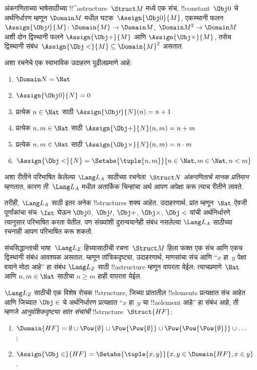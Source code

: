 \documentclass[../../../include/open-logic-section]{subfiles}
\begin{document}
\begin{ex}
अंकगणिताच्या भाषेसाठीच्या !!^a{structure}~$\Struct M$ मध्ये एक संच,
!!{constant}~$\Obj 0$ चे अर्थनिर्धारण म्हणून $\Domain M$ मधील
घटक~$\Assign{\Obj 0}{M}$, एकस्थानी फलन
$\Assign{\Obj \prime}{M} \colon \Domain{M} \to \Domain M$,
$\Domain M^2 \to \Domain M$ अशी दोन द्विस्थानी फलने
$\Assign{\Obj +}{M}$ आणि $\Assign{\Obj \times}{M}$, तसेच द्विस्थानी
संबंध~$\Assign{\Obj <}{M} \subseteq \Domain{M}^2$ असतात.

अशा रचनेचे एक स्वाभाविक उदाहरण पुढीलप्रमाणे आहे:
\begin{enumerate}
\item $\Domain N = \Nat$
\item $\Assign{\Obj 0}{N} = 0$
\item प्रत्येक $n \in \Nat$ साठी $\Assign{\Obj \prime}{N}(n) = n + 1$
\item प्रत्येक $n, m \in \Nat$ साठी $\Assign{\Obj +}{N}(n, m) = n + m$
\item प्रत्येक $n, m \in \Nat$ साठी $\Assign{\Obj \times}{N}(n, m) = n\cdot m$
\item $\Assign{\Obj <}{N} = \Setabs{\tuple{n, m}}{n \in \Nat, m \in
  \Nat, n < m}$
\end{enumerate}
अशा रीतीने परिभाषित केलेल्या $\Lang L_A$ साठीच्या रचनेला~$\Struct N$
\emph{अंकगणिताचे मानक प्रतिमान} म्हणतात, कारण ती~$\Lang L_A$ मधील
अतार्किक चिन्हांचा अर्थ आपण अपेक्षा करू त्याच रीतीने लावते.

तरीही, $\Lang L_A$ साठी इतर अनेक !!{structure}s शक्य आहेत. उदाहरणार्थ,
प्रांत म्हणून~$\Nat$ ऐवजी पूर्णांकांचा संच~$\Int$ घेऊन $\Obj 0$,
$\Obj \prime$, $\Obj +$, $\Obj \times$, $\Obj <$ यांची अर्थनिर्धारणे
त्यानुसार परिभाषित करता येतील. पण संख्यांशी दुरान्वयानेही संबंध नसलेल्या
$\Lang L_A$ साठीच्या रचनाही आपण परिभाषित करू शकतो.
\end{ex}

\begin{ex}
संचसिद्धान्ताची भाषा~$\Lang L_Z$ हिच्यासाठीची रचना~$\Struct M$ हिला
फक्त एक संच आणि एकच द्विस्थानी संबंध आवश्यक असतात. म्हणून तांत्रिकदृष्ट्या,
उदाहरणार्थ, माणसांचा संच आणि ``$x$ हा~$y$ पेक्षा वयाने मोठा आहे'' हा संबंध
$\Lang L_Z$ साठी !!a{structure} म्हणून वापरता येईल; त्याचप्रमाणे~$\Nat$
आणि $n, m \in \Nat$ साठीचा $n \ge m$ हाही वापरता येईल.

$\Lang L_Z$ साठीची एक विशेष रोचक !!{structure}, जिच्या प्रांतातील
!!{element}s प्रत्यक्षात संच आहेत आणि जिच्यात $\Obj \in$ चे अर्थनिर्धारण
प्रत्यक्षात ``$x$ हा~$y$ चा !!a{element} आहे'' हा संबंध आहे, ती म्हणजे
\emph{आनुवंशिकदृष्ट्या सांत संचांची} !!{structure}~$\Struct{{HF}}$:
\begin{enumerate}
\item $\Domain{{{HF}}} = \emptyset \cup \Pow{\emptyset} \cup
  \Pow{\Pow{\emptyset}} \cup \Pow{\Pow{\Pow{\emptyset}}} \cup \dots$;
\item $\Assign{\Obj \in}{{{HF}}} = \Setabs{\tuple{x, y}}{x, y \in
  \Domain{{{HF}}}, x \in y}$.
\end{enumerate}
\end{ex}
\end{document}
